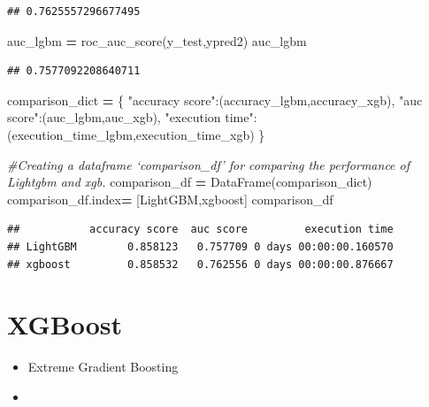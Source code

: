 \documentclass[
]{book}
\newenvironment{Shaded}{\begin{snugshade}}{\end{snugshade}}
\newcommand{\CommentTok}[1]{\textcolor[rgb]{0.56,0.35,0.01}{\textit{#1}}}
\newcommand{\NormalTok}[1]{#1}
\newcommand{\OperatorTok}[1]{\textcolor[rgb]{0.81,0.36,0.00}{\textbf{#1}}}
\newcommand{\StringTok}[1]{\textcolor[rgb]{0.31,0.60,0.02}{#1}}
\begin{document}
\begin{verbatim}
## 0.7625557296677495
\end{verbatim}

\begin{Shaded}
\begin{Highlighting}[]
\NormalTok{auc\_lgbm }\OperatorTok{=}\NormalTok{ roc\_auc\_score(y\_test,ypred2)}
\NormalTok{auc\_lgbm}
\end{Highlighting}
\end{Shaded}

\begin{verbatim}
## 0.7577092208640711
\end{verbatim}

\begin{Shaded}
\begin{Highlighting}[]
\NormalTok{comparison\_dict }\OperatorTok{=}\NormalTok{ \{}
    \StringTok{"accuracy score"}\NormalTok{:(accuracy\_lgbm,accuracy\_xgb),}
    \StringTok{"auc score"}\NormalTok{:(auc\_lgbm,auc\_xgb),}
    \StringTok{"execution time"}\NormalTok{:(execution\_time\_lgbm,execution\_time\_xgb)}
\NormalTok{    \}}

\CommentTok{\#Creating a dataframe ‘comparison\_df’ for comparing the performance of Lightgbm and xgb. }
\NormalTok{comparison\_df }\OperatorTok{=}\NormalTok{ DataFrame(comparison\_dict) }
\NormalTok{comparison\_df.index}\OperatorTok{=}\NormalTok{ [}\StringTok{\textquotesingle{}LightGBM\textquotesingle{}}\NormalTok{,}\StringTok{\textquotesingle{}xgboost\textquotesingle{}}\NormalTok{] }
\NormalTok{comparison\_df}
\end{Highlighting}
\end{Shaded}

\begin{verbatim}
##           accuracy score  auc score         execution time
## LightGBM        0.858123   0.757709 0 days 00:00:00.160570
## xgboost         0.858532   0.762556 0 days 00:00:00.876667
\end{verbatim}

\hypertarget{xgboost}{%
\section{XGBoost}\label{xgboost}}

\begin{itemize}
\item
  Extreme Gradient Boosting
\item
\end{itemize}
\end{document}

